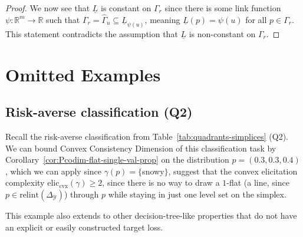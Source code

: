 \documentclass[11pt]{article} %
\newcommand{\reals}{\mathbb{R}}
\newcommand{\simplex}{\Delta_\Y}
\newcommand{\relint}[1]{\mathrm{relint}(#1)}
\newcommand{\eliccvx}{\mathrm{elic}_\mathrm{cvx}}
\newcommand{\Y}{\mathcal{Y}}
\newcommand{\lbar}{\underline{L}} %
\begin{document}
\begin{proof}
  We now see that $\lbar$ is constant on $\Gamma_r$ since there is some link function $\psi:\reals^m\to\reals$ such that $\Gamma_r = \hat\Gamma_u \subseteq \lbar_{\psi(u)}$, meaning $\lbar(p) = \psi(u)$ for all $p\in\Gamma_r$.
  This statement contradicts the assumption that $\lbar$ is non-constant on $\Gamma_r$.
\end{proof}



\section{Omitted Examples}\label{app:omitted-examples}
\subsection{Risk-averse classification (Q2)}

Recall the risk-averse classification from Table~\ref{tab:quadrants-simplices} (Q2).
We can bound Convex Consistency Dimension of this classification task by Corollary~\ref{cor:Pcodim-flat-single-val-prop} on the distribution $p = (0.3,0.3,0.4)$, which we can apply since $\gamma(p) = \{$snowy$\}$, suggest that the convex elicitation complexity $\eliccvx(\gamma) \geq 2$, since there is no way to draw a $1$-flat (a line, since $p \in \relint{\simplex}$) through $p$ while staying in just one level set on the simplex.

This example also extends to other decision-tree-like properties that do not have an explicit or easily constructed target loss.
\end{document}

